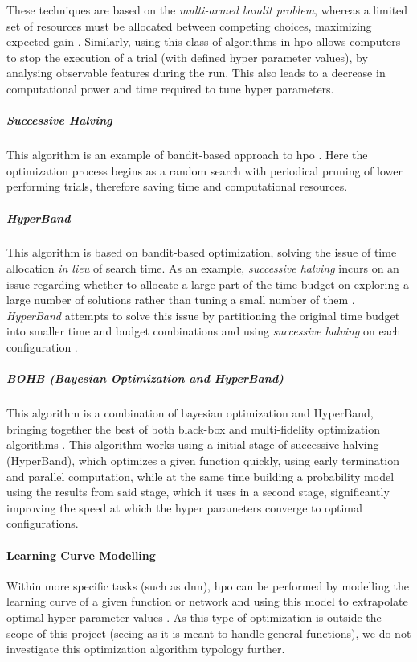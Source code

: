 These techniques are based on the \textit{multi-armed bandit problem}, whereas a limited set of resources must be allocated between competing choices, maximizing expected gain \parencite{Katehakis1987TheMB}. Similarly, using this class of algorithms in \acrshort{hpo} allows computers to stop the execution of a trial (with defined hyper parameter values), by analysing observable features during the run. This also leads to a decrease in computational power and time required to tune hyper parameters. 

\subparagraph{Successive Halving} 
This algorithm is an example of bandit-based approach to \acrshort{hpo} \parencite{jamieson2015nonstochastic}. Here the optimization process begins as a random search with periodical pruning of lower performing trials, therefore saving time and computational resources. 

\subparagraph{HyperBand}
This algorithm is based on bandit-based optimization, solving the issue of time allocation \textit{in lieu} of search time. As an example, \textit{successive halving} incurs on an issue regarding whether to allocate a large part of the time budget on exploring a large number of solutions rather than tuning a small number of them \parencite{elshawi2019automated}. \textit{HyperBand} attempts to solve this issue by partitioning the original time budget into smaller time and budget combinations and using \textit{successive halving} on each configuration \parencite{li2016hyperband}.

\subparagraph{BOHB (Bayesian Optimization and HyperBand)}
This algorithm is a combination of bayesian optimization and HyperBand, bringing together the best of both black-box and multi-fidelity optimization algorithms \parencite{pmlr-v80-falkner18a}. This algorithm works using a initial stage of successive halving (HyperBand), which optimizes a given function quickly, using early termination and parallel computation, while at the same time building a probability model using the results from said stage, which it uses in a second stage, significantly improving the speed at which the hyper parameters converge to optimal configurations.

\paragraph{Learning Curve Modelling}
Within more specific tasks (such as \acrfull{dnn}), \acrshort{hpo} can be performed by modelling the learning curve of a given function or network and using this model to extrapolate optimal hyper parameter values \parencite{10.5555/2832581.2832731}. As this type of optimization is outside the scope of this project (seeing as it is meant to handle general functions), we do not investigate this optimization algorithm typology further.